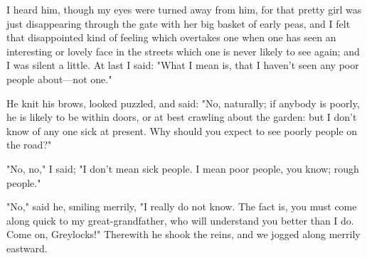 I heard him, though my eyes were turned away from him, for that pretty
girl was just disappearing through the gate with her big basket of early
peas, and I felt that disappointed kind of feeling which overtakes one
when one has seen an interesting or lovely face in the streets which one
is never likely to see again; and I was silent a little. At last I said:
"What I mean is, that I haven't seen any poor people about---not one."

He knit his brows, looked puzzled, and said: "No, naturally; if anybody
is poorly, he is likely to be within doors, or at best crawling about
the garden: but I don't know of any one sick at present. Why should you
expect to see poorly people on the road?"

"No, no," I said; "I don't mean sick people. I mean poor people, you
know; rough people."

"No," said he, smiling merrily, "I really do not know. The fact is, you
must come along quick to my great-grandfather, who will understand you
better than I do. Come on, Greylocks!" Therewith he shook the reins, and
we jogged along merrily eastward.

